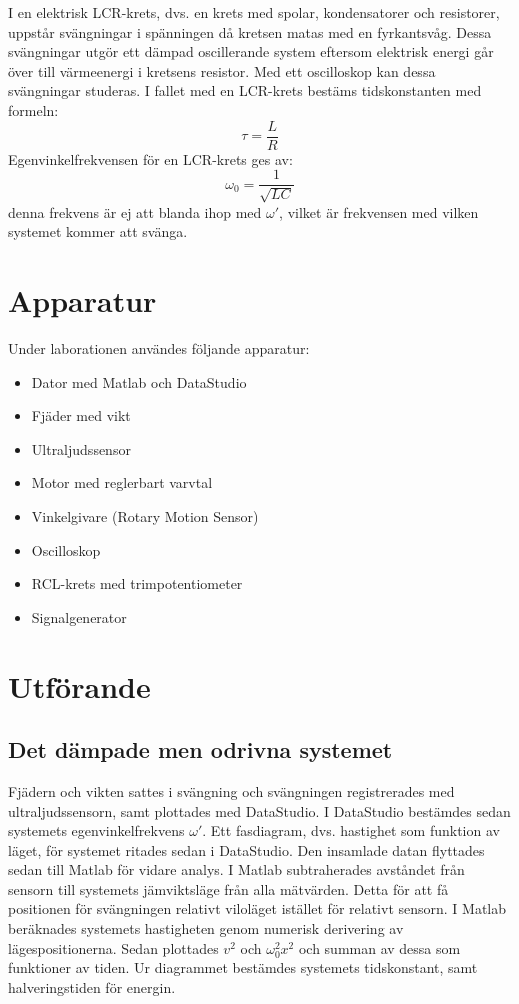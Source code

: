 \documentclass[a4paper,10pt]{article}
\begin{document}
\indent I en elektrisk LCR-krets, dvs. en krets med spolar, kondensatorer och resistorer, uppstår svängningar i spänningen då kretsen matas med en fyrkantsvåg. Dessa svängningar utgör ett dämpad oscillerande system eftersom elektrisk energi går över till värmeenergi i kretsens resistor. Med ett oscilloskop kan dessa svängningar studeras. I fallet med en LCR-krets bestäms tidskonstanten med formeln: 
\begin{equation}
\tau = \frac{L}{R}
\end{equation}
Egenvinkelfrekvensen för en LCR-krets ges av:
\begin{equation}
\omega_0 = \frac{1}{\sqrt{LC}}
\end{equation}
denna frekvens är ej att blanda ihop med $\omega'$, vilket är frekvensen med vilken systemet kommer att svänga.

\pagebreak
\section{Apparatur}
Under laborationen användes följande apparatur:
\begin{itemize}
	\item Dator med Matlab och DataStudio
	\item Fjäder med vikt
	\item Ultraljudssensor
	\item Motor med reglerbart varvtal
	\item Vinkelgivare (Rotary Motion Sensor)
	\item Oscilloskop
	\item RCL-krets med trimpotentiometer
	\item Signalgenerator
\end{itemize}

\section{Utförande}
\subsection{Det dämpade men odrivna systemet}
Fjädern och vikten sattes i svängning och svängningen registrerades med ultraljudssensorn, samt plottades med DataStudio. I DataStudio bestämdes sedan systemets egenvinkelfrekvens $\omega'$. Ett fasdiagram, dvs. hastighet som funktion av läget, för systemet ritades sedan i DataStudio. Den insamlade datan flyttades sedan till Matlab för vidare analys. I Matlab subtraherades avståndet från sensorn till systemets jämviktsläge från alla mätvärden. Detta för att få positionen för svängningen relativt viloläget istället för relativt sensorn. I Matlab beräknades systemets hastigheten genom numerisk derivering av lägespositionerna. Sedan plottades $v^2$ och $\omega_0^2x^2$ och summan av dessa som funktioner av tiden. Ur diagrammet bestämdes systemets tidskonstant, samt halveringstiden för energin.
\end{document}
